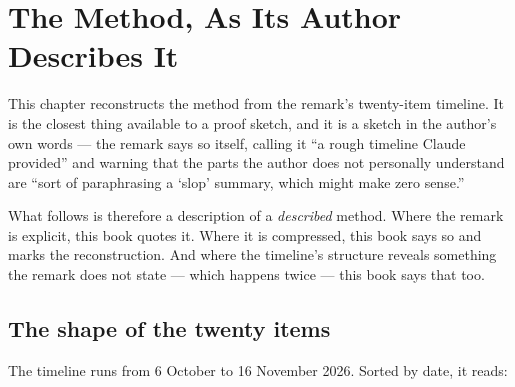
\chapter{The Method, As Its Author Describes It}
\label{ch:method}

This chapter reconstructs the method from the remark's twenty-item timeline.
It is the closest thing available to a proof sketch, and it is a sketch in the
author's own words --- the remark says so itself, calling it ``a rough timeline
Claude provided'' and warning that the parts the author does not personally
understand are ``sort of paraphrasing a `slop' summary, which might make zero
sense.''

What follows is therefore a description of a \emph{described} method. Where the
remark is explicit, this book quotes it. Where it is compressed, this book says
so and marks the reconstruction. And where the timeline's structure reveals
something the remark does not state --- which happens twice --- this book says
that too.

\section{The shape of the twenty items}The timeline runs from 6 October to 16 November 2026. Sorted by date, it reads:

